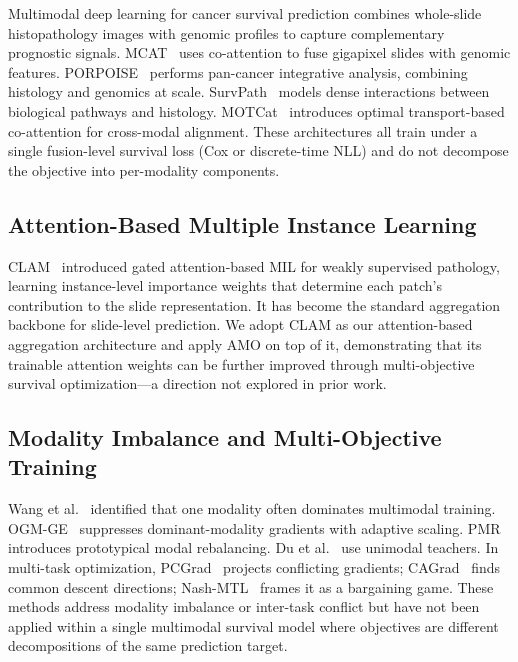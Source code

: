 \documentclass[10pt,twocolumn,letterpaper]{article}
\begin{document}
Multimodal deep learning for cancer survival prediction combines
whole-slide histopathology images with genomic profiles to capture
complementary prognostic signals.
MCAT~\cite{chen2021} uses co-attention to fuse gigapixel slides
with genomic features.
PORPOISE~\cite{chen2022porpoise} performs pan-cancer integrative
analysis, combining histology and genomics at scale.
SurvPath~\cite{jaume2024survpath} models dense interactions between
biological pathways and histology. MOTCat~\cite{xu2023motcat}
introduces optimal transport-based co-attention for cross-modal
alignment. These architectures all train under a single fusion-level
survival loss (Cox or discrete-time NLL) and do not decompose
the objective into per-modality components.

\subsection{Attention-Based Multiple Instance Learning}

CLAM~\cite{lu2021abmil} introduced gated attention-based MIL for
weakly supervised pathology, learning instance-level importance
weights that determine each patch's contribution to the slide
representation. It has become the standard aggregation backbone
for slide-level prediction. We adopt CLAM as our attention-based
aggregation architecture and apply AMO on top of it, demonstrating
that its trainable attention weights can be further improved
through multi-objective survival optimization---a direction not
explored in prior work.

\subsection{Modality Imbalance and Multi-Objective Training}

Wang et al.~\cite{wang2020what} identified that one modality often
dominates multimodal training. OGM-GE~\cite{peng2022ogm} suppresses
dominant-modality gradients with adaptive scaling.
PMR~\cite{fan2023pmr} introduces prototypical modal rebalancing.
Du et al.~\cite{du2023unimodal} use unimodal teachers. In
multi-task optimization, PCGrad~\cite{yu2020pcgrad} projects
conflicting gradients; CAGrad~\cite{liu2021cagrad} finds common
descent directions; Nash-MTL~\cite{navon2022nashmtl} frames it as
a bargaining game. These
methods address modality imbalance or inter-task conflict but have
not been applied within a single multimodal survival model where
objectives are different decompositions of the same prediction
target.
\end{document}
